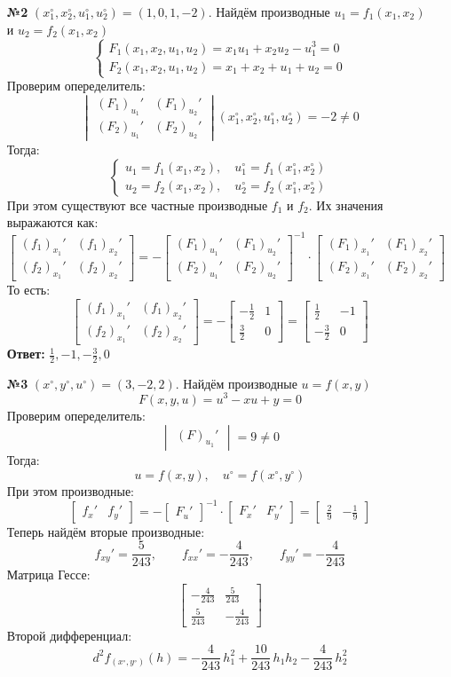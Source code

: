 \documentclass[a4paper]{article}
\newcommand{\matsq}[1]{\begin{bmatrix} #1 \end{bmatrix}}
\newcommand{\vmat}[1]{\begin{vmatrix} #1 \end{vmatrix}}
\renewcommand{\f}[2]{\frac{#1}{#2}}
\newcommand{\case}[1]{\begin{cases} #1 \end{cases}}
\begin{document}
\begin{enumerate}
    \item[\textbf{№2}]$(x_1^\circ, x_2^\circ, u_1^\circ, u_2^\circ) = (1, 0, 1, -2)$. 
    Найдём производные $u_1 = f_1(x_1, x_2)$ и $u_2 = f_2(x_1, x_2)$
    $$\case{
        F_1(x_1, x_2, u_1, u_2) = x_1u_1+x_2u_2-u_1^3 = 0\\
        F_2(x_1, x_2, u_1, u_2) = x_1 + x_2 + u_1 + u_2 = 0
    }$$
    Проверим опеределитель:
    $$\vmat{(F_1)_{u_1}' & (F_1)_{u_2}' \\ (F_2)_{u_1}' & (F_2)_{u_2}'} 
    (x_1^\circ, x_2^\circ, u_1^\circ, u_2^\circ) 
    = -2 \neq 0$$
    Тогда:
    $$\case{
        u_1 = f_1(x_1, x_2), \quad u_1^\circ = f_1(x_1^\circ, x_2^\circ)\\
        u_2 = f_2(x_1, x_2), \quad u_2^\circ = f_2(x_1^\circ, x_2^\circ)
    }$$
    При этом существуют все частные производные $f_1$ и $f_2$. Их значения выражаются как:
    $$\matsq{(f_1)_{x_1}' & (f_1)_{x_2}'\\ (f_2)_{x_1}' & (f_2)_{x_2}'} =
     - \matsq{(F_1)_{u_1}' & (F_1)_{u_2}' \\ (F_2)_{u_1}' & (F_2)_{u_2}'}^{-1}
      \cdot \matsq{(F_1)_{x_1}' & (F_1)_{x_2}'\\(F_2)_{x_1}' & (F_2)_{x_2}'}$$
     То есть:
    \[
    \matsq{(f_1)_{x_1}' & (f_1)_{x_2}'\\ (f_2)_{x_1}' & (f_2)_{x_2}'} = -\begin{bmatrix} -\frac{1}{2} & 1 \\ \frac{3}{2} & 0 \end{bmatrix} = \begin{bmatrix} \frac{1}{2} & -1 \\ -\frac{3}{2} & 0 \end{bmatrix}
    \]
    \textbf{Ответ: } $\frac{1}{2}, -1, -\frac{3}{2}, 0$\\

    \item[\textbf{№3}]$(x^\circ, y^\circ, u^\circ) = (3, -2, 2)$. 
    Найдём производные $u = f(x, y)$
    $$F(x, y, u) = u^3 - xu + y = 0$$
    Проверим опеределитель:
    $$\vmat{(F)_{u_1}'}  = 9\neq 0$$
    Тогда:
    $$u = f(x, y), \quad u^{\circ} = f(x^\circ, y^\circ)$$
    При этом производные:
    $$\matsq{f_x' & f_y'} = 
    -\matsq{F_u'}^{-1}\cdot \matsq{F_x' & F_y'} = \matsq{\f{2}{9} & -\f{1}{9}}$$
    Теперь найдём вторые производные:
    $$f_{xy}'=\frac{5}{243},\qquad f_{xx}'=-\frac{4}{243},\qquad f_{yy}'=-\frac{4}{243}$$
    Матрица Гессе:
    $$\matsq{-\frac{4}{243} & \frac{5}{243} \\ \frac{5}{243} & -\frac{4}{243}}$$
    Второй дифференциал:
    $$d^2f_{(x^\circ, y^\circ)}(h)= -\frac{4}{243} \, h_1^2 + \frac{10}{243} \, h_1h_2 - \frac{4}{243} \, h_2^2$$


\end{enumerate}
\end{document}
